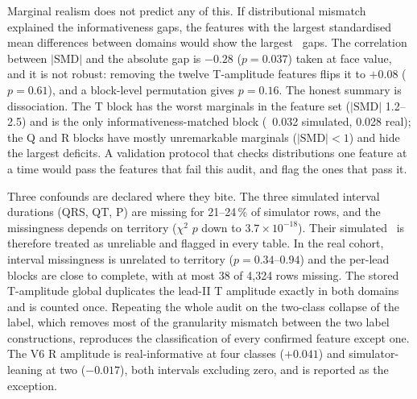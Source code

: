Marginal realism does not predict any of this. If distributional mismatch explained the informativeness gaps, the features with the largest standardised mean differences between domains would show the largest \etasq\ gaps. The correlation between $|\mathrm{SMD}|$ and the absolute gap is $-0.28$ ($p=0.037$) taken at face value, and it is not robust: removing the twelve T-amplitude features flips it to $+0.08$ ($p=0.61$), and a block-level permutation gives $p=0.16$. The honest summary is dissociation. The T block has the worst marginals in the feature set ($|\mathrm{SMD}|$ 1.2--2.5) and is the only informativeness-matched block (\etasq\ 0.032 simulated, 0.028 real); the Q and R blocks have mostly unremarkable marginals ($|\mathrm{SMD}| < 1$) and hide the largest deficits. A validation protocol that checks distributions one feature at a time would pass the features that fail this audit, and flag the ones that pass it. 

Three confounds are declared where they bite. The three simulated interval durations (QRS, QT, P) are missing for 21--24\,\% of simulator rows, and the missingness depends on territory ($\chi^2$ $p$ down to $3.7\times10^{-18}$). Their simulated \etasq\ is therefore treated as unreliable and flagged in every table. In the real cohort, interval missingness is unrelated to territory ($p = 0.34$--$0.94$) and the per-lead blocks are close to complete, with at most 38 of 4,324 rows missing. The stored T-amplitude global duplicates the lead-II T amplitude exactly in both domains and is counted once. Repeating the whole audit on the two-class collapse of the label, which removes most of the granularity mismatch between the two label constructions, reproduces the classification of every confirmed feature except one. The V6 R amplitude is real-informative at four classes ($+0.041$) and simulator-leaning at two ($-0.017$), both intervals excluding zero, and is reported as the exception. 

